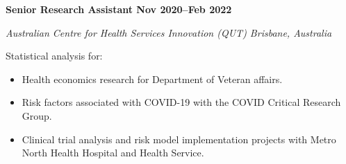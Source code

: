 
\textbf{Senior Research Assistant \hfill Nov 2020--Feb 2022}\par
\textit{Australian Centre for Health Services Innovation (QUT) \hfill Brisbane, Australia}\par
Statistical analysis for: \par
\begin{itemize}
	\item Health economics research for Department of Veteran affairs.
	\item Risk factors associated with COVID-19 with the COVID Critical Research Group.
    \item Clinical trial analysis and risk model implementation projects with Metro North Health Hospital and Health Service.
\end{itemize}\par